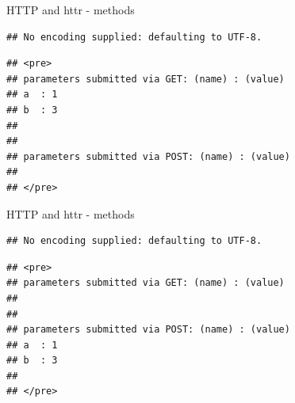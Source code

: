 \documentclass[ignorenonframetext,]{beamer}
\newenvironment{Shaded}{\begin{snugshade}}{\end{snugshade}}
\newcommand{\KeywordTok}[1]{\textcolor[rgb]{0.13,0.29,0.53}{\textbf{{#1}}}}
\newcommand{\DataTypeTok}[1]{\textcolor[rgb]{0.13,0.29,0.53}{{#1}}}
\newcommand{\DecValTok}[1]{\textcolor[rgb]{0.00,0.00,0.81}{{#1}}}
\newcommand{\StringTok}[1]{\textcolor[rgb]{0.31,0.60,0.02}{{#1}}}
\newcommand{\NormalTok}[1]{{#1}}
\begin{document}
\begin{frame}[fragile]{HTTP and httr - methods}

\begin{Shaded}
\end{Shaded}

\begin{verbatim}
## No encoding supplied: defaulting to UTF-8.
\end{verbatim}

\begin{verbatim}
## <pre>
## parameters submitted via GET: (name) : (value)
## a  : 1
## b  : 3
## 
## 
## parameters submitted via POST: (name) : (value)
## 
## </pre>
\end{verbatim}

\end{frame}

\begin{frame}[fragile]{HTTP and httr - methods}

\begin{Shaded}
\end{Shaded}

\begin{verbatim}
## No encoding supplied: defaulting to UTF-8.
\end{verbatim}

\begin{verbatim}
## <pre>
## parameters submitted via GET: (name) : (value)
## 
## 
## parameters submitted via POST: (name) : (value)
## a  : 1
## b  : 3
## 
## </pre>
\end{verbatim}

\end{frame}
\end{document}
